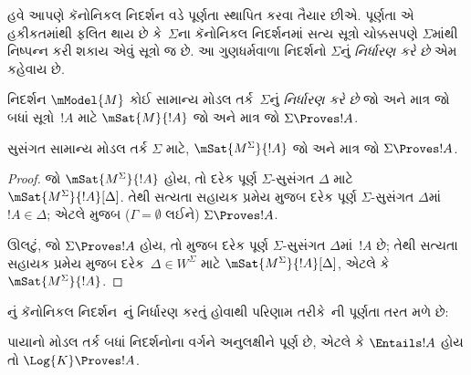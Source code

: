 
\label{guunit:OLP-0448}


હવે આપણે કૅનોનિકલ નિદર્શન વડે પૂર્ણતા સ્થાપિત કરવા તૈયાર છીએ.
પૂર્ણતા એ હકીકતમાંથી ફલિત થાય છે કે~$\Sigma$ના કૅનોનિકલ નિદર્શનમાં
સત્ય સૂત્રો ચોક્કસપણે $\Sigma$માંથી નિષ્પન્ન કરી શકાય એવું સૂત્રો જ છે.
આ ગુણધર્મવાળા નિદર્શનો $\Sigma$નું \emph{નિર્ધારણ કરે છે} એમ કહેવાય છે.

\begin{defn}
  નિદર્શન $\mModel{M}$ કોઈ સામાન્ય મોડલ તર્ક~$\Sigma$નું
  \emph{નિર્ધારણ કરે છે} જો અને માત્ર જો બધાં સૂત્રો~$!A$
  માટે $\mSat{M}{!A}$ જો અને માત્ર જો $\Sigma \Proves !A$.
\end{defn}

\begin{thm}[નિર્ધારણ]
   સુસંગત સામાન્ય મોડલ તર્ક $\Sigma$ માટે,
   $\mSat{M^\Sigma}{!A}$ જો અને માત્ર જો $\Sigma \Proves !A$.
\end{thm}

\begin{proof}
  જો $\mSat{M^\Sigma}{!A}$ હોય, તો દરેક પૂર્ણ
  $\Sigma$-સુસંગત $\Delta$ માટે $\mSat{M^\Sigma}{!A}[\Delta]$.
  તેથી સત્યતા સહાયક પ્રમેય મુજબ દરેક પૂર્ણ $\Sigma$-સુસંગત
  $\Delta$માં $!A \in \Delta$; એટલે
   મુજબ ($\Gamma =
  \emptyset$ લઈને) $\Sigma \Proves !A$.

  ઊલટું, જો $\Sigma \Proves !A$ હોય, તો
  મુજબ દરેક પૂર્ણ $\Sigma$-સુસંગત $\Delta$માં~$!A$ છે; તેથી
  સત્યતા સહાયક પ્રમેય મુજબ દરેક~$\Delta \in W^\Sigma$ માટે
  $\mSat{M^\Sigma}{!A}[\Delta]$, એટલે કે
  $\mSat{M^\Sigma}{!A}$.
\end{proof}


નું કૅનોનિકલ નિદર્શન~નું નિર્ધારણ કરતું હોવાથી
પરિણામ તરીકે~ની પૂર્ણતા તરત મળે છે:

\begin{cor}
  પાયાનો મોડલ તર્ક  બધાં નિદર્શનોના વર્ગને અનુલક્ષીને પૂર્ણ
  છે, એટલે કે $\Entails !A$ હોય તો $\Log{K} \Proves !A$.
\end{cor}


